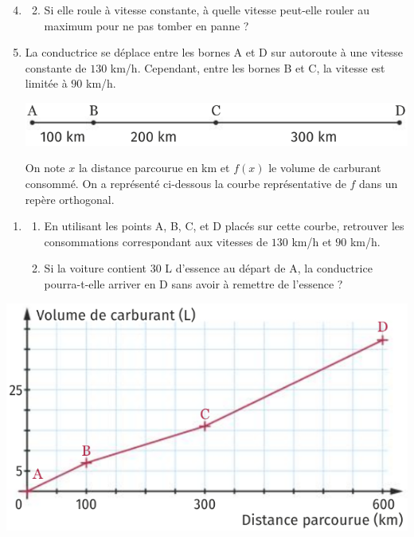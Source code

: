 \documentclass[11pt]{article}
\begin{document}
\begin{enumerate}[leftmargin=*]
    \setcounter{enumi}{3}
  \item[]
    \begin{enumerate}
        \setcounter{enumii}{1}
      \item Si elle roule à vitesse constante, à quelle vitesse peut-elle
          rouler au maximum pour ne pas tomber en panne ?
\end{enumerate}
\item La conductrice se déplace entre les bornes A et D sur autoroute à une
  vitesse constante de $130$ km/h. Cependant, entre les bornes B et C, la
  vitesse est limitée à $90$ km/h.
  \begin{center}
    \includegraphics[scale=.4]{bornes.png}
  \end{center}
  On note $x$ la distance parcourue en km et $f(x)$ le volume de carburant
  consommé. On a représenté ci-dessous la courbe représentative de $f$ dans un
  repère orthogonal.
\end{enumerate}
\begin{minipage}{.5\textwidth}
  \begin{enumerate}[leftmargin=*]
    \item[] \begin{enumerate}
        \item En utilisant les points A, B, C, et D placés sur cette courbe,
          retrouver les consommations correspondant aux vitesses de $130$ km/h
          et $90$ km/h.
        \item Si la voiture contient $30$ L d'essence au départ de A, la
          conductrice pourra-t-elle arriver en D sans avoir à remettre de
          l'essence ?
      \end{enumerate}
  \end{enumerate}
\end{minipage}
\begin{minipage}{.5\textwidth}
  \begin{center}
    \includegraphics[scale=.4]{carburant.png}
  \end{center}
\end{minipage}
\end{document}
